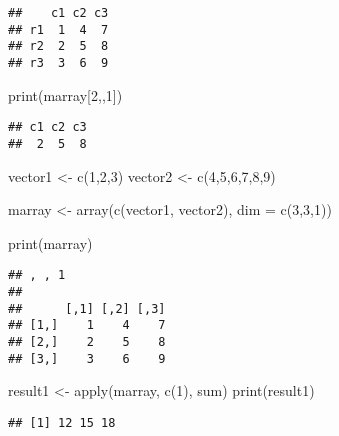 \documentclass[
]{article}
\newenvironment{Shaded}{\begin{snugshade}}{\end{snugshade}}
\newcommand{\AttributeTok}[1]{\textcolor[rgb]{0.77,0.63,0.00}{#1}}
\newcommand{\DecValTok}[1]{\textcolor[rgb]{0.00,0.00,0.81}{#1}}
\newcommand{\FunctionTok}[1]{\textcolor[rgb]{0.00,0.00,0.00}{#1}}
\newcommand{\NormalTok}[1]{#1}
\newcommand{\OtherTok}[1]{\textcolor[rgb]{0.56,0.35,0.01}{#1}}
\begin{document}
\begin{verbatim}
##    c1 c2 c3
## r1  1  4  7
## r2  2  5  8
## r3  3  6  9
\end{verbatim}

\begin{Shaded}
\begin{Highlighting}[]
\FunctionTok{print}\NormalTok{(marray[}\DecValTok{2}\NormalTok{,,}\DecValTok{1}\NormalTok{])}
\end{Highlighting}
\end{Shaded}

\begin{verbatim}
## c1 c2 c3 
##  2  5  8
\end{verbatim}

\begin{Shaded}
\begin{Highlighting}[]
\NormalTok{vector1 }\OtherTok{\textless{}{-}} \FunctionTok{c}\NormalTok{(}\DecValTok{1}\NormalTok{,}\DecValTok{2}\NormalTok{,}\DecValTok{3}\NormalTok{)}
\NormalTok{vector2 }\OtherTok{\textless{}{-}} \FunctionTok{c}\NormalTok{(}\DecValTok{4}\NormalTok{,}\DecValTok{5}\NormalTok{,}\DecValTok{6}\NormalTok{,}\DecValTok{7}\NormalTok{,}\DecValTok{8}\NormalTok{,}\DecValTok{9}\NormalTok{)}

\NormalTok{marray }\OtherTok{\textless{}{-}} \FunctionTok{array}\NormalTok{(}\FunctionTok{c}\NormalTok{(vector1, vector2),}
                \AttributeTok{dim =} \FunctionTok{c}\NormalTok{(}\DecValTok{3}\NormalTok{,}\DecValTok{3}\NormalTok{,}\DecValTok{1}\NormalTok{))}

\FunctionTok{print}\NormalTok{(marray)}
\end{Highlighting}
\end{Shaded}

\begin{verbatim}
## , , 1
## 
##      [,1] [,2] [,3]
## [1,]    1    4    7
## [2,]    2    5    8
## [3,]    3    6    9
\end{verbatim}

\begin{Shaded}
\begin{Highlighting}[]
\NormalTok{result1 }\OtherTok{\textless{}{-}} \FunctionTok{apply}\NormalTok{(marray, }\FunctionTok{c}\NormalTok{(}\DecValTok{1}\NormalTok{), sum)}
\FunctionTok{print}\NormalTok{(result1)}
\end{Highlighting}
\end{Shaded}

\begin{verbatim}
## [1] 12 15 18
\end{verbatim}
\end{document}
